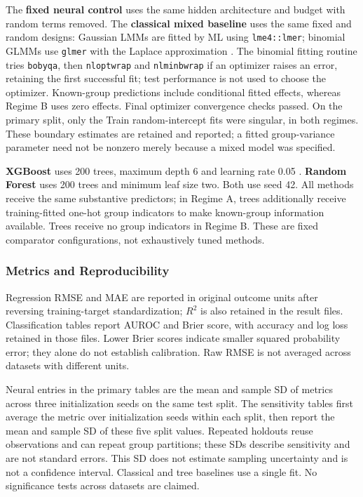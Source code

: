 The \textbf{fixed neural control} uses the same hidden architecture and budget with random terms removed. The \textbf{classical mixed baseline} uses the same fixed and random designs: Gaussian LMMs are fitted by ML using \texttt{lme4::lmer}; binomial GLMMs use \texttt{glmer} with the Laplace approximation \citep{bates2014fitting}. The binomial fitting routine tries \texttt{bobyqa}, then \texttt{nloptwrap} and \texttt{nlminbwrap} if an optimizer raises an error, retaining the first successful fit; test performance is not used to choose the optimizer. Known-group predictions include conditional fitted effects, whereas Regime B uses zero effects. Final optimizer convergence checks passed. On the primary split, only the Train random-intercept fits were singular, in both regimes. These boundary estimates are retained and reported; a fitted group-variance parameter need not be nonzero merely because a mixed model was specified.

\textbf{XGBoost} uses 200 trees, maximum depth 6 and learning rate 0.05 \citep{chen2016xgboost}. \textbf{Random Forest} uses 200 trees and minimum leaf size two. Both use seed 42. All methods receive the same substantive predictors; in Regime A, trees additionally receive training-fitted one-hot group indicators to make known-group information available. Trees receive no group indicators in Regime B. These are fixed comparator configurations, not exhaustively tuned methods.

\subsubsection{Metrics and Reproducibility}

Regression RMSE and MAE are reported in original outcome units after reversing training-target standardization; $R^2$ is also retained in the result files. Classification tables report AUROC and Brier score, with accuracy and log loss retained in those files. Lower Brier scores indicate smaller squared probability error; they alone do not establish calibration. Raw RMSE is not averaged across datasets with different units.

Neural entries in the primary tables are the mean and sample SD of metrics across three initialization seeds on the same test split. The sensitivity tables first average the metric over initialization seeds within each split, then report the mean and sample SD of these five split values. Repeated holdouts reuse observations and can repeat group partitions; these SDs describe sensitivity and are not standard errors. This SD does not estimate sampling uncertainty and is not a confidence interval. Classical and tree baselines use a single fit. No significance tests across datasets are claimed.

